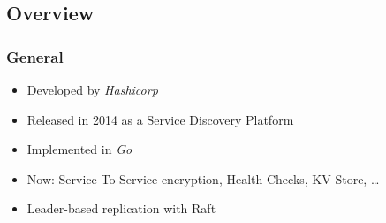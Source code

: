 
\subsection{Overview}

\begin{frame}
	\frametitle{General}
	\begin{itemize}
		\item Developed by \emph{Hashicorp}
		\item Released in 2014 as a Service Discovery Platform
		\item Implemented in \emph{Go}
		\item Now: Service-To-Service encryption, Health Checks, KV Store, \ldots
		\item Leader-based replication with Raft
	\end{itemize}
\end{frame}

